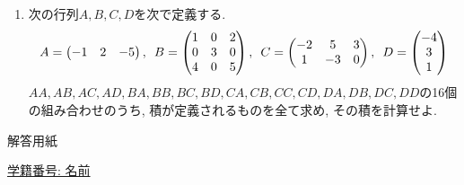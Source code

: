\documentclass[dvipdfmx,a4paper,12pt]{article} %
\theoremstyle{definition}
\theoremstyle{definition}
\theoremstyle{remark}
\numberwithin{equation}{section}
\begin{document}
\begin{enumerate}[label={\large \textbf{第}\arabic*\textbf{問}.}]
(1)
$
\begin{pmatrix}
 1& 0 & 3\\
 4 &-1&3\\
 0 & 2& 1\\
 \end{pmatrix}
 \begin{pmatrix}
 0 &1&-2 \\
 7&-5&4\\
 1 &0&-2 \\
 \end{pmatrix}
 $
 \quad
(2)
$
\begin{pmatrix}
 2 &-1 \\
 4 &0 \\
 3&-5\\
 \end{pmatrix}
 \left\{
 2
 \begin{pmatrix}
 0 &1&-2 \\
 7&-5&4\\
 \end{pmatrix}
 - 3
  \begin{pmatrix}
 1 &-2&6 \\
 4&-1&5\\
 \end{pmatrix}
\right\}
 $
 
\item  次の行列$A,B,C,D$を次で定義する.
 $$
  A=\begin{pmatrix} %
 -1 & 2 &-5  \\
 \end{pmatrix} 
 \text{, \,\,} 
B= \begin{pmatrix} %
 1& 0 & 2\\
 0 & 3 & 0\\
 4 & 0 & 5 \\
 \end{pmatrix} %
 \text{, \,\,} 
 C=
  \begin{pmatrix}
 -2 &5 & 3\\
1 &-3&0  \\
 \end{pmatrix}
 \text{, \,\,} 
 D= \begin{pmatrix} %
 -4\\
 3 \\
 1
 \end{pmatrix}
 $$
 $AA, AB, AC, AD, BA, BB, BC, BD, CA, CB, CC, CD, DA, DB, DC, DD$の16個の組み合わせのうち, 積が定義されるものを全て求め, その積を計算せよ.
 
\end{enumerate}
 
 \newpage
 
  \begin{center}
 {\Large 解答用紙}
\end{center}


\begin{flushleft}
{ \large \underline{学籍番号: \hspace{4cm} 名前  \hspace{9cm}   }  }
\end{flushleft}
 

 
\end{document}
